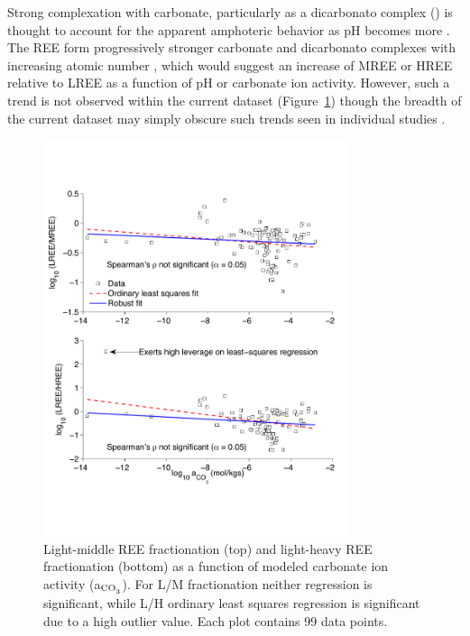 Strong complexation with carbonate, particularly as a dicarbonato complex () is thought to account for the apparent amphoteric behavior as pH becomes more  \citep{Millero_GCA_1992, Wood_CG_1990, Johannesson_AG_1995}.
The REE form progressively stronger carbonate and dicarbonato complexes with increasing atomic number \citep{Millero_GCA_1992, Wood_CG_1990}, which would suggest an increase of MREE or HREE relative to LREE as a function of pH or carbonate ion activity.
However, such a trend is not observed within the current dataset (Figure~\ref{fig:frac_vs_acarb}) though the breadth of the current dataset may simply obscure such trends seen in individual studies \citep[e.g. Ref.][]{Choi_CG_2009}.

\begin{figure}[htbp]
\begin{center}
\includegraphics[width=0.8\textwidth]{Ch3_figures/REE-ratios-vs-act_carb.pdf}
\caption{Light-middle REE fractionation (top) and light-heavy REE fractionation (bottom) as a function of modeled carbonate ion activity (a$_{\ce{CO3}}$).
For L/M fractionation neither regression is significant, while L/H ordinary least squares regression is significant due to a high outlier value. Each plot contains 99 data points.}\label{fig:frac_vs_acarb}
\end{center}
\end{figure}

